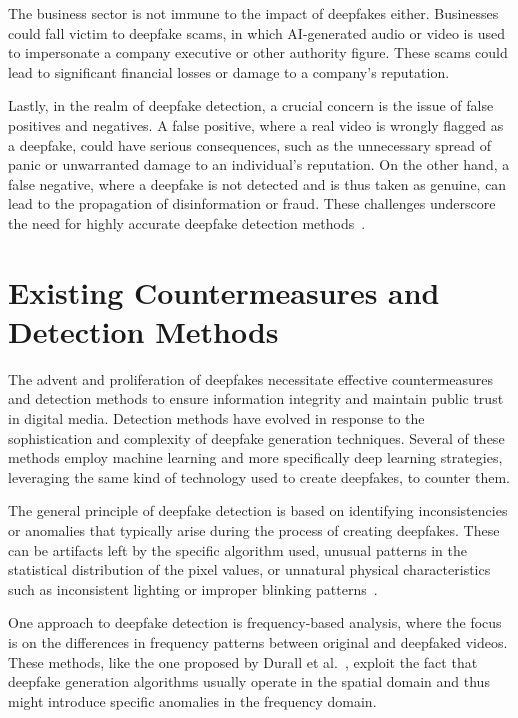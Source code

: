 The business sector is not immune to the impact of deepfakes either. Businesses
could fall victim to deepfake scams, in which \ac{AI}-generated audio or video
is used to impersonate a company executive or other authority figure.
These scams could lead to significant financial losses or damage to a
company's reputation.

Lastly, in the realm of deepfake detection, a crucial concern is the issue of
false positives and negatives. A false positive, where a real video is wrongly
flagged as a deepfake, could have serious consequences, such as the unnecessary
spread of panic or unwarranted damage to an individual's reputation. On the
other hand, a false negative, where a deepfake is not detected and is thus
taken as genuine, can lead to the propagation of disinformation or fraud.
These challenges underscore the need for highly accurate deepfake detection methods~\cite{roessler2019faceforensicspp}.

\section{Existing Countermeasures and Detection Methods}\label{chapter:countermeasures}
The advent and proliferation of deepfakes necessitate effective countermeasures
and detection methods to ensure information integrity and maintain public trust
in digital media. Detection methods have evolved in response to the sophistication
and complexity of deepfake generation techniques. Several of these methods employ
machine learning and more specifically deep learning strategies, leveraging the
same kind of technology used to create deepfakes, to counter them.

The general principle of deepfake detection is based on identifying inconsistencies
or anomalies that typically arise during the process of creating deepfakes. These
can be artifacts left by the specific algorithm used, unusual patterns in the
statistical distribution of the pixel values, or unnatural physical characteristics
such as inconsistent lighting or improper blinking patterns~\cite{Agarwal_2019_CVPR_Workshops}.

One approach to deepfake detection is frequency-based analysis, where the focus is
on the differences in frequency patterns between original and deepfaked videos.
These methods, like the one proposed by Durall et al.~\cite{durall2020unmasking},
exploit the fact that deepfake generation algorithms usually operate in the
spatial domain and thus might introduce specific anomalies in the frequency domain.

